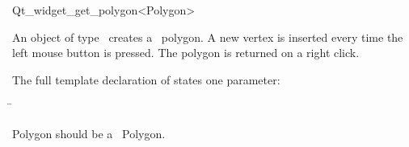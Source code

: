 
\begin{ccRefClass}{Qt_widget_get_polygon<Polygon>}

\ccDefinition
An object of type \ccRefName\ creates a \cgal\ polygon. A new 
vertex is inserted every time the left mouse button is pressed.
The polygon is returned on a right click.


\ccParameters

The full template declaration of  states one parameter:

\begin{tabbing}
 \=\\
\end{tabbing}

Polygon should be a \cgal\ Polygon.

\ccInheritsFrom
{}

\ccGlue

\ccCreation
{}


\end{ccRefClass}









